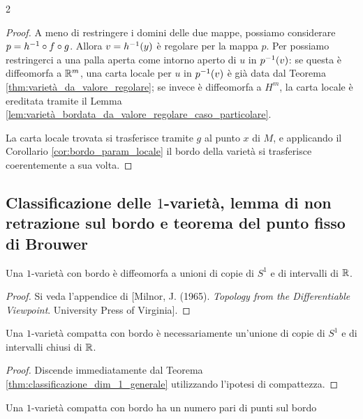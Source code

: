 \begin{multicols*}{2}
\begin{proof}
        A meno di restringere i domini delle due mappe, possiamo considerare $p = h^{-1} \circ f \circ g$.
        Allora $v = h^{-1}(y)$ è regolare per la mappa $p$. Per possiamo
        restringerci a una palla aperta come intorno aperto di $u$ in $p^{-1}(v)$: se questa è diffeomorfa a $\mathbb{R}^m$, una carta locale per $u$
        in $p^{-1}(v)$ è già data dal Teorema \ref{thm:varietà_da_valore_regolare}; se invece è diffeomorfa a
        $H^m$, la carta locale è ereditata tramite il Lemma \ref{lem:varietà_bordata_da_valore_regolare_caso_particolare}. \smallskip

        La carta locale trovata si trasferisce tramite $g$ al punto $x$ di $M$, e applicando il Corollario \ref{cor:bordo_param_locale}
        il bordo della varietà si trasferisce coerentemente a sua volta.
    \end{proof}

    \subsection{Classificazione delle \texorpdfstring{$1$}{1}-varietà, lemma di non retrazione sul bordo e teorema del punto fisso di Brouwer}

    \begin{theorem} \label{thm:classificazione_dim_1_generale}
        Una $1$-varietà con bordo è diffeomorfa a unioni di copie di $S^1$ e
        di intervalli di $\mathbb{R}$.
    \end{theorem}

    \begin{proof}
        Si veda l'appendice di [Milnor, J. (1965). \textit{Topology from the Differentiable Viewpoint}. University Press of Virginia].
    \end{proof}

    \begin{corollary} \label{cor:classificazione_dim_1}
        Una $1$-varietà compatta con bordo è necessariamente un'unione
        di copie di $S^1$ e di intervalli chiusi di $\mathbb{R}$.
    \end{corollary}

    \begin{proof}
        Discende immediatamente dal Teorema \ref{thm:classificazione_dim_1_generale}
        utilizzando l'ipotesi di compattezza.
    \end{proof}

    \begin{corollary} \label{cor:punti_pari_su_1varietà}
        Una $1$-varietà compatta con bordo ha un numero pari di punti sul bordo
    \end{corollary}


\end{multicols*}
